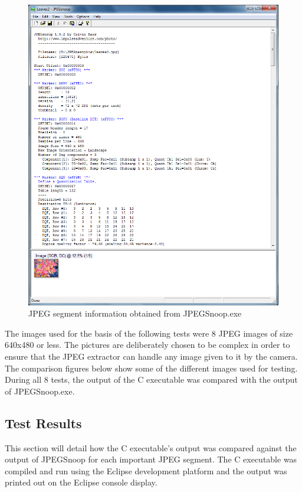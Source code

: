\begin{figure}[!hbtp]
\begin{center}
\includegraphics[scale=0.6]{figures/jpegSnoopEx1.png} 
\end{center}
\caption{JPEG segment information obtained from JPEGSnoop.exe}
\end{figure}

The images used for the basis of the following tests
were 8 JPEG images of size 640x480 or
less. The pictures are deliberately chosen to be 
complex in order to ensure that the JPEG extractor 
can handle any image given to it by the camera.
The comparison figures below show some of the 
different images used for testing. During all 8 tests,
the output of the C executable was compared with
the output of JPEGSnoop.exe.

\subsection{Test Results}

This section will detail how the C executable's output 
was compared against the output of JPEGSnoop 
for each important JPEG segment. The C 
executable was compiled and run using
the Eclipse development platform and the output
was printed out on the Eclipse console display.

